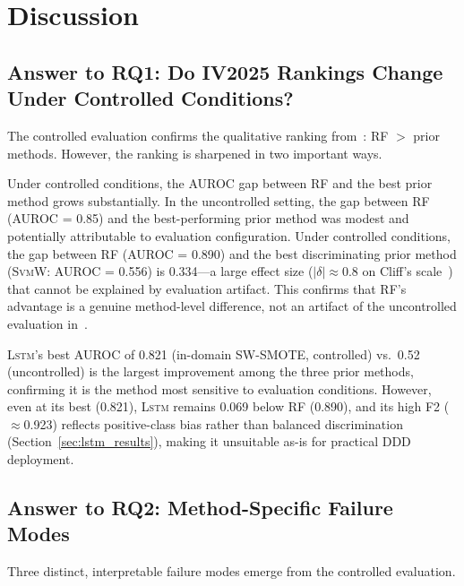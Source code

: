 \documentclass[lettersize,journal]{IEEEtran}
\newcommand{\Impl}[1]{\textsc{#1}}
\begin{document}
\section{Discussion}
\label{sec:discussion}

\subsection{Answer to RQ1: Do IV2025 Rankings Change Under Controlled Conditions?}
\label{sec:rq1}

The controlled evaluation confirms the qualitative ranking from~\cite{nakagama2025iv}: RF $>$ prior methods.
However, the ranking is sharpened in two important ways.

Under controlled conditions, the AUROC gap between RF and the best prior method grows substantially.
In the uncontrolled setting, the gap between RF (AUROC = 0.85) and the best-performing prior method was modest and potentially attributable to evaluation configuration.
Under controlled conditions, the gap between RF (AUROC = 0.890) and the best discriminating prior method (\Impl{SvmW}: AUROC = 0.556) is 0.334---a large effect size ($|\delta| \approx 0.8$ on Cliff's scale~\cite{cliff1993}) that cannot be explained by evaluation artifact.
This confirms that RF's advantage is a genuine method-level difference, not an artifact of the uncontrolled evaluation in~\cite{nakagama2025iv}.

\Impl{Lstm}'s best AUROC of 0.821 (in-domain SW-SMOTE, controlled) vs.\ 0.52 (uncontrolled) is the largest improvement among the three prior methods, confirming it is the method most sensitive to evaluation conditions.
However, even at its best (0.821), \Impl{Lstm} remains 0.069 below RF (0.890), and its high F2 ($\approx$0.923) reflects positive-class bias rather than balanced discrimination (Section~\ref{sec:lstm_results}), making it unsuitable as-is for practical DDD deployment.

\subsection{Answer to RQ2: Method-Specific Failure Modes}
\label{sec:rq2}

Three distinct, interpretable failure modes emerge from the controlled evaluation.
\end{document}
